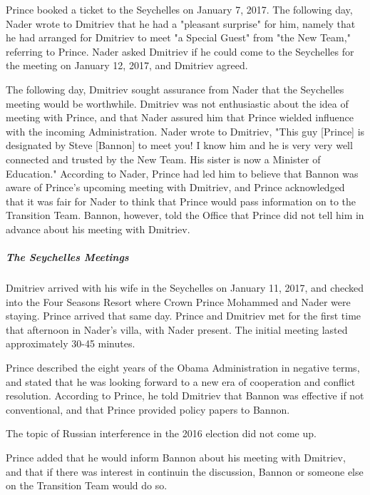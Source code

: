Prince booked a ticket to the Seychelles on January 7, 2017.%
The following day, Nader wrote to Dmitriev that he had a "pleasant surprise" for him, namely that he had arranged for Dmitriev to meet "a Special Guest" from "the New Team," referring to Prince.%
Nader asked Dmitriev if he could come to the Seychelles for the meeting on January 12, 2017, and Dmitriev agreed.%

The following day, Dmitriev sought assurance from Nader that the Seychelles meeting would be worthwhile.%
Dmitriev was not enthusiastic about the idea of meeting with Prince, and that Nader assured him that Prince wielded influence with the incoming Administration.%
Nader wrote to Dmitriev, "This guy [Prince] is designated by Steve [Bannon] to meet you!
I know him and he is very very well connected and trusted by the New Team.
His sister is now a Minister of Education."%
According to Nader, Prince had led him to believe that Bannon was aware of Prince's upcoming meeting with Dmitriev, and Prince acknowledged that it was fair for Nader to think that Prince would pass information on to the Transition Team.%
Bannon, however, told the Office that Prince did not tell him in advance about his meeting with Dmitriev.%

\subparagraph{The Seychelles Meetings}

Dmitriev arrived with his wife in the Seychelles on January 11, 2017, and checked into the Four Seasons Resort where Crown Prince Mohammed and Nader were staying.%
Prince arrived that same day.%
Prince and Dmitriev met for the first time that afternoon in Nader's villa, with Nader present.%
The initial meeting lasted approximately 30-45 minutes.%

Prince described the eight years of the Obama Administration in negative terms, and stated that he was looking forward to a new era of cooperation and conflict resolution.%
According to Prince, he told Dmitriev that Bannon was effective if not conventional, and that Prince provided policy papers to Bannon.%

The topic of Russian interference in the 2016 election did not come up.%

Prince added that he would inform Bannon about his meeting with Dmitriev, and that if there was interest in continuin the discussion, Bannon or someone else on the Transition Team would do so.%

